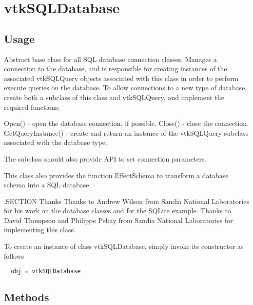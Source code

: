 \section{vtkSQLDatabase}

\subsection{Usage}

 Abstract base class for all SQL database connection classes.
 Manages a connection to the database, and is responsible for creating
 instances of the associated vtkSQLQuery objects associated with this
 class in order to perform execute queries on the database.
 To allow connections to a new type of database, create both a subclass
 of this class and vtkSQLQuery, and implement the required functions:

 Open() - open the database connection, if possible.
 Close() - close the connection.
 GetQueryInstance() - create and return an instance of the vtkSQLQuery
                      subclass associated with the database type.

 The subclass should also provide API to set connection parameters.

 This class also provides the function EffectSchema to transform a 
 database schema into a SQL database.

 .SECTION Thanks
 Thanks to Andrew Wilson from Sandia National Laboratories for his work
 on the database classes and for the SQLite example. Thanks to David Thompson 
 and Philippe Pebay from Sandia National Laboratories for implementing
 this class.


To create an instance of class vtkSQLDatabase, simply
invoke its constructor as follows
\begin{verbatim}
  obj = vtkSQLDatabase
\end{verbatim}
\subsection{Methods}

